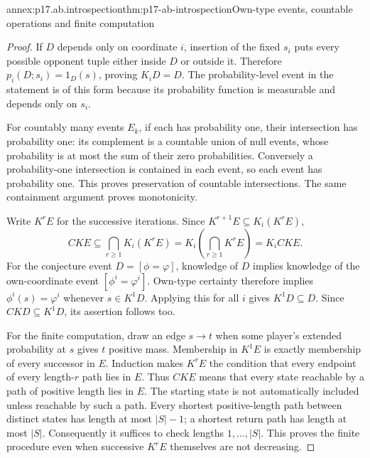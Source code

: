 \begin{annexitem}{annex:p17.ab.introspection}{thm:p17-ab-introspection}{Own-type events, countable operations and finite computation}
\begin{proof}
If \(D\) depends only on coordinate \(i\), insertion of the fixed
\(s_i\) puts every possible opponent tuple either inside \(D\)
or outside it. Therefore \(p_i(D;s_i)=1_D(s)\), proving
\(K_iD=D\). The probability-level event in the statement is of
this form because its probability function is measurable and
depends only on \(s_i\).

For countably many events \(E_k\), if each has probability one,
their intersection has probability one: its complement is a
countable union of null events, whose probability is at most the
sum of their zero probabilities. Conversely a probability-one
intersection is contained in each event, so each event has
probability one. This proves preservation of countable
intersections. The same containment argument proves monotonicity.

Write \(K^rE\) for the successive iterations. Since
\(K^{r+1}E\subseteq K_i(K^rE)\),
\[
 CKE\subseteq\bigcap_{r\geq1}K_i(K^rE)
       =K_i\!\left(\bigcap_{r\geq1}K^rE\right)=K_iCKE.
\]
For the conjecture event \(D=[\phi=\varphi]\), knowledge of \(D\)
implies knowledge of the own-coordinate event
\([\phi^i=\varphi^i]\). Own-type certainty therefore implies
\(\phi^i(s)=\varphi^i\) whenever \(s\in K^1D\).
Applying this for all \(i\) gives \(K^1D\subseteq D\).
Since \(CKD\subseteq K^1D\), its assertion follows too.

For the finite computation, draw an edge \(s\to t\) when some
player's extended probability at \(s\) gives \(t\) positive mass.
Membership in \(K^1E\) is exactly membership of every successor in
\(E\). Induction makes \(K^rE\) the condition that every endpoint
of every length-\(r\) path lies in \(E\).
Thus \(CKE\) means that every state reachable by a path of positive
length lies in \(E\). The starting state is not automatically
included unless reachable by such a path.
Every shortest positive-length path between distinct states has
length at most \(|S|-1\); a shortest return path has length at most
\(|S|\). Consequently it suffices to check lengths
\(1,\ldots,|S|\). This proves the finite procedure even when
successive \(K^rE\) themselves are not decreasing.
\end{proof}
\end{annexitem}

